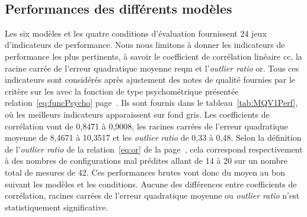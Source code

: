 \begin{table}[htbp]
\centering
{}\\
\caption{Répartition des contenus TVHD de la base de l'annexe~\ref{annex:base} en une base d'apprentissage et une base d'évaluation, utilisées pour le calcul des indicateurs de performance des différents modèles évalués.}
\label{tab:bases}
\end{table}


\subsection{Performances des différents modèles}
Les six modèles et les quatre conditions d'évaluation fournissent 24 jeux d'indicateurs de performance. Nous nous limitons à donner les indicateurs de performance les plus pertinents, à savoir le coefficient de corrélation linéaire cc, la racine carrée de l'erreur quadratique moyenne reqm et l'\emph{outlier ratio} or. Tous ces indicateurs sont considérés après ajustement des notes de qualité fournies par le critère sur les \Dcent{} avec la fonction de type psychométrique présentée relation~\ref{eq:funcPsycho} page~\pageref{eq:funcPsycho}. Ils sont fournis dans le tableau~\ref{tab:MQV1Perf}, où les meilleurs indicateurs apparaissent sur fond gris. Les coefficients de corrélation vont de 0,8471 à 0,9008, les racines carrées de l'erreur quadratique moyenne de 8,4671 à 10,3517 et les \emph{outlier ratio} de 0,33 à 0,48. Selon la définition de l'\emph{outlier ratio} de la relation~\ref{eq:or} de la page~\pageref{eq:or}, cela correspond respectivement à des nombres de configurations mal prédites allant de 14 à 20 sur un nombre total de mesures de 42. Ces performances brutes vont donc du moyen au bon suivant les modèles et les conditions. Aucune des différences entre coefficients de corrélation, racines carrées de l'erreur quadratique moyenne ou \emph{outlier ratio} n'est statistiquement significative.

